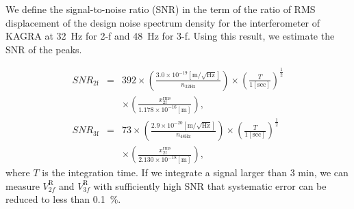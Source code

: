 \documentclass[%
 reprint,
superscriptaddress,
 amsmath,amssymb,
 aps,
]{revtex4-1}
\begin{document}
We define the signal-to-noise ratio (SNR) in the term of the ratio of RMS displacement of the design noise spectrum density for the interferometer of KAGRA at 32~Hz for 2-f and 48~Hz for 3-f.
Using this result, we estimate the SNR of the peaks.

\footnotesize
\begin{eqnarray}
\!S\!N\!R_{\mathrm{2f}}&=&392 \times \left(\frac{3.0 \times 10^{-19} [\mathrm{m/\sqrt{Hz}}]}{n_{\mathrm{32Hz}}} \right)  \times \left(\frac{T}{1 [\mathrm{sec}]} \right)^{\frac{1}{2}} \nonumber \\
 &&\times \left(\frac{x_{\mathrm{2f}}^{\mathrm{rms}}}{1.178 \times 10^{-16}\mathrm{[m]} }  \right),   \\
\!S\!N\!R_{\mathrm{3f}}&=&73 \times \left(\frac{2.9 \times 10^{-20} [\mathrm{m/\sqrt{Hz}}]}{n_{\mathrm{48Hz}}} \right) \times \left(\frac{T}{1 [\mathrm{sec}]} \right)^{\frac{1}{2}}  \nonumber \\ 
&&\times \left(\frac{x_{\mathrm{2f}}^{\mathrm{rms}}}{2.130 \times 10^{-18}\mathrm{[m] }} \right),
\end{eqnarray}
\normalsize
where $T$ is the integration time. If we integrate a signal larger than 3 min, we can measure $V^{\mathrm{R}}_{2f}$ and $V^{\mathrm{R}}_{3f}$ with sufficiently high SNR that systematic error can be reduced to less than 0.1~\%. 
\end{document}
